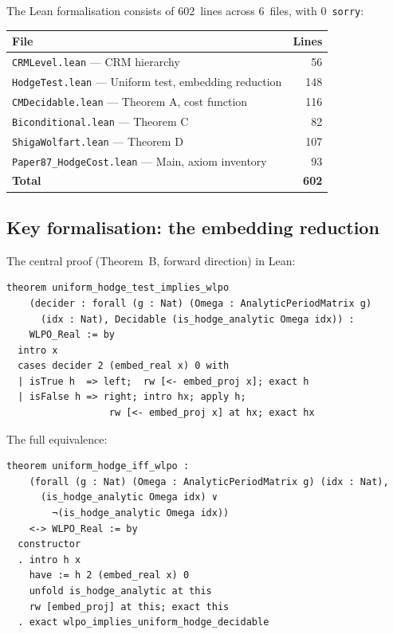 \documentclass[11pt]{article}
\theoremstyle{plain}
\theoremstyle{definition}
\theoremstyle{remark}
\begin{document}
The Lean formalisation consists of 602~lines across 6~files, with 0~\texttt{sorry}:

\begin{center}
\begin{tabular}{lr}
\toprule
\textbf{File} & \textbf{Lines} \\
\midrule
\texttt{CRMLevel.lean} --- CRM hierarchy & 56 \\
\texttt{HodgeTest.lean} --- Uniform test, embedding reduction & 148 \\
\texttt{CMDecidable.lean} --- Theorem A, cost function & 116 \\
\texttt{Biconditional.lean} --- Theorem C & 82 \\
\texttt{ShigaWolfart.lean} --- Theorem D & 107 \\
\texttt{Paper87\_HodgeCost.lean} --- Main, axiom inventory & 93 \\
\midrule
\textbf{Total} & \textbf{602} \\
\bottomrule
\end{tabular}
\end{center}

\subsection{Key formalisation: the embedding reduction}

The central proof (Theorem~B, forward direction) in Lean:

\begin{lstlisting}[style=leanstyle]
theorem uniform_hodge_test_implies_wlpo
    (decider : forall (g : Nat) (Omega : AnalyticPeriodMatrix g)
      (idx : Nat), Decidable (is_hodge_analytic Omega idx)) :
    WLPO_Real := by
  intro x
  cases decider 2 (embed_real x) 0 with
  | isTrue h  => left;  rw [<- embed_proj x]; exact h
  | isFalse h => right; intro hx; apply h;
                  rw [<- embed_proj x] at hx; exact hx
\end{lstlisting}

The full equivalence:

\begin{lstlisting}[style=leanstyle]
theorem uniform_hodge_iff_wlpo :
    (forall (g : Nat) (Omega : AnalyticPeriodMatrix g) (idx : Nat),
      (is_hodge_analytic Omega idx) ∨
        ¬(is_hodge_analytic Omega idx))
    <-> WLPO_Real := by
  constructor
  . intro h x
    have := h 2 (embed_real x) 0
    unfold is_hodge_analytic at this
    rw [embed_proj] at this; exact this
  . exact wlpo_implies_uniform_hodge_decidable
\end{lstlisting}
\end{document}
